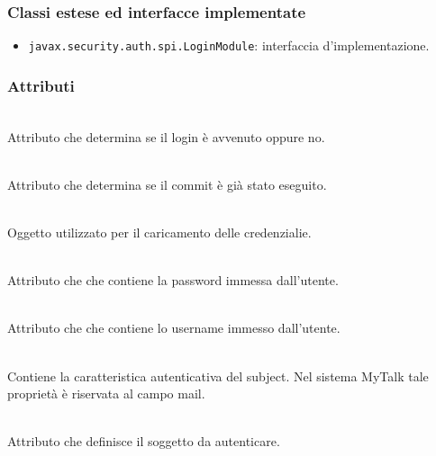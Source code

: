 \subsubsection*{Classi estese ed interfacce implementate}
\begin{itemize}
	\item \texttt{javax.security.auth.spi.LoginModule}: interfaccia d'implementazione.
\end{itemize}

\subsubsection*{Attributi}
\begin{description}
  \item{}\\
  Attributo che determina se il login è avvenuto oppure no.
  \item{}\\
  Attributo che determina se il commit è già stato eseguito.
  \item{}\\
  Oggetto utilizzato per il caricamento delle credenzialie.
  \item{}\\
  Attributo che che contiene la password immessa dall'utente.
  \item{}\\
   Attributo che che contiene lo username immesso dall'utente.
  \item{}\\
  Contiene la caratteristica autenticativa del subject. Nel sistema MyTalk tale proprietà è riservata al campo mail.
  \item{}\\
  Attributo che definisce il soggetto da autenticare.
\end{description}

